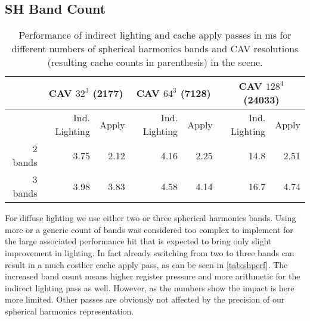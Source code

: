 \documentclass[thesis.tex]{subfiles}
\begin{document}
\subsection{SH Band Count}
\begin{table}[htbp]
  \centering
    \begin{tabular}{r|rr|rr|rr}
    \toprule
          & \multicolumn{2}{c|}{CAV $32^3$ (2177)} & \multicolumn{2}{c|}{CAV $64^3$ (7128)} & \multicolumn{2}{c}{CAV $128^4$ (24033)} \\
    \midrule
          & \small{Ind. Lighting} & Apply & Ind. Lighting & Apply & Ind. Lighting & Apply \\
    \midrule
    2 bands & 3.75  & 2.12  & 4.16  & 2.25  & 14.8  & 2.51 \\
    3 bands & 3.98  & 3.83  & 4.58  & 4.14  & 16.7  & 4.74 \\
    \bottomrule
    \end{tabular}
\caption{Performance of indirect lighting and cache apply passes in \si{\milli\second} for different numbers of spherical harmonics bands and CAV resolutions (resulting cache counts in parenthesis) in the  scene. }
\label{tab:shperf}
\end{table}
For diffuse lighting we use either two or three spherical harmonics bands.
Using more or a generic count of bands was considered too complex to implement for the large associated performance hit that is expected to bring only slight improvement in lighting.
In fact already switching from two to three bands can result in a much costlier cache apply pass, as can be seen in \autoref{tab:shperf}.
The increased band count means higher register pressure and more arithmetic for the indirect lighting pass as well.
However, as the numbers show the impact is here more limited.
Other passes are obviously not affected by the precision of our spherical harmonics representation.
\end{document}
